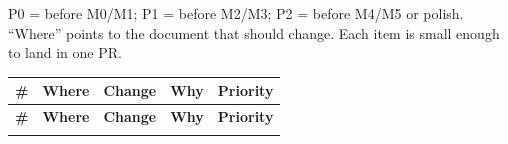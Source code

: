 \documentclass[10.5pt]{article}
\begin{document}
\newpage
{}

{\small
P0 = before M0/M1; P1 = before M2/M3; P2 = before M4/M5 or polish. ``Where'' points to the document that should change. Each item is small enough to land in one PR.
}

\begingroup
\small
\setlength{\tabcolsep}{4pt}
\begin{longtable}{@{}p{0.55cm} >{\raggedright\arraybackslash}p{2.25cm} >{\raggedright\arraybackslash}p{7.25cm} >{\raggedright\arraybackslash}p{4.35cm} >{\raggedright\arraybackslash}p{1.55cm}@{}}
\toprule
\textbf{\#} & \textbf{Where} & \textbf{Change} & \textbf{Why} & \textbf{Priority} \\
\midrule
\endfirsthead
\toprule
\textbf{\#} & \textbf{Where} & \textbf{Change} & \textbf{Why} & \textbf{Priority} \\
\midrule
\endhead
\bottomrule
\endfoot


\end{longtable}
\end{document}
